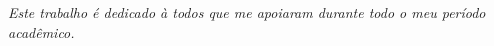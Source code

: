 \documentclass[
	12pt,				%
	openright,			%
	oneside,			%
	a4paper,			%
	english,			%
	french,				%
	spanish,			%
	brazil				%
	]{abntex2}
\begin{document}

%
% 
%
%
%
%    
%        

      
%  

\begin{dedicatoria}
    \vspace*{\fill}
    \centering
    \noindent
    \textit{ Este trabalho é dedicado à todos que me apoiaram durante todo o meu período acadêmico.} \vspace*{\fill}
\end{dedicatoria}
\end{document}
